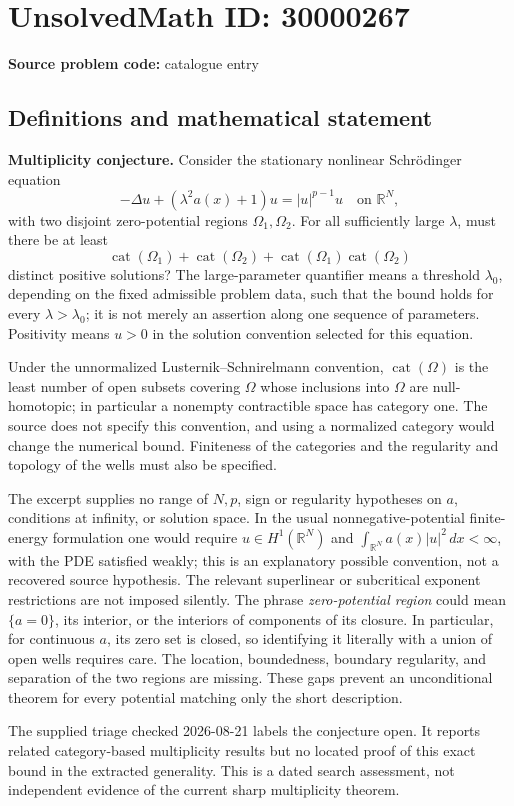 \documentclass[11pt]{article}
\newcommand{\R}{\mathbb{R}}
\begin{document}
\section*{UnsolvedMath ID: 30000267}
\textbf{Source problem code:} catalogue entry
\subsection{Definitions and mathematical statement}
\textbf{Multiplicity conjecture.} Consider the stationary nonlinear Schr\"odinger equation\[-\Delta u+(\lambda^2a(x)+1)u=|u|^{p-1}u\quad\text{on }\R^N,\] with two disjoint zero-potential regions \(\Omega_1,\Omega_2\). For all sufficiently large \(\lambda\), must there be at least\[\operatorname{cat}(\Omega_1)+\operatorname{cat}(\Omega_2)+\operatorname{cat}(\Omega_1)\operatorname{cat}(\Omega_2)\] distinct positive solutions? The large-parameter quantifier means a threshold \(\lambda_0\), depending on the fixed admissible problem data, such that the bound holds for every \(\lambda>\lambda_0\); it is not merely an assertion along one sequence of parameters. Positivity means \(u>0\) in the solution convention selected for this equation.\par Under the unnormalized Lusternik--Schnirelmann convention, \(\operatorname{cat}(\Omega)\) is the least number of open subsets covering \(\Omega\) whose inclusions into \(\Omega\) are null-homotopic; in particular a nonempty contractible space has category one. The source does not specify this convention, and using a normalized category would change the numerical bound. Finiteness of the categories and the regularity and topology of the wells must also be specified.\par The excerpt supplies no range of \(N,p\), sign or regularity hypotheses on \(a\), conditions at infinity, or solution space. In the usual nonnegative-potential finite-energy formulation one would require \(u\in H^1(\R^N)\) and \(\int_{\R^N}a(x)|u|^2\,dx<\infty\), with the PDE satisfied weakly; this is an explanatory possible convention, not a recovered source hypothesis. The relevant superlinear or subcritical exponent restrictions are not imposed silently. The phrase \emph{zero-potential region} could mean \(\{a=0\}\), its interior, or the interiors of components of its closure. In particular, for continuous \(a\), its zero set is closed, so identifying it literally with a union of open wells requires care. The location, boundedness, boundary regularity, and separation of the two regions are missing. These gaps prevent an unconditional theorem for every potential matching only the short description.\par The supplied triage checked 2026-08-21 labels the conjecture open. It reports related category-based multiplicity results but no located proof of this exact bound in the extracted generality. This is a dated search assessment, not independent evidence of the current sharp multiplicity theorem.
\end{document}

